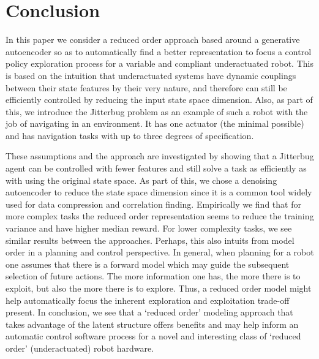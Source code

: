 \documentclass[letterpaper, 10 pt, conference]{ieeeconf}
\begin{document}


\section{Conclusion}

In this paper we consider a reduced order approach based around a generative autoencoder so as to automatically find a better representation to focus a control policy exploration process for a variable and compliant underactuated robot.  This is based on the intuition that underactuated systems have dynamic couplings between their state features by their very nature, and therefore can still be efficiently controlled by reducing the input state space dimension.   Also, as part of this, we introduce the Jitterbug problem as an example of such a robot with the job of navigating in an environment.  It has one actuator (the minimal possible) and has navigation tasks with up to three degrees of specification.

These assumptions and the approach are investigated by showing that a Jitterbug agent can be controlled with fewer features and still solve a task as efficiently as with using the original state space.  As part of this, we chose a denoising autoencoder to reduce the state space dimension since it is a common tool widely used for data compression and correlation finding.  Empirically we find that for more complex tasks the reduced order representation seems to reduce the training  variance and have higher median reward.   For lower complexity tasks, we see similar results between the approaches.  Perhaps, this also intuits from model order in a planning and control perspective.  In general, when planning for a robot one assumes that there is a forward model which may guide the subsequent selection of future actions. The more information one has, the more there is to exploit, but also the more there is to explore.  Thus, a reduced order model might help automatically focus the inherent exploration and exploitation trade-off present.       In conclusion, we see that a `reduced order' modeling approach that takes advantage of the latent structure offers benefits and may help inform an automatic control software process for a novel and interesting class of `reduced order' (underactuated) robot hardware.
\end{document}
